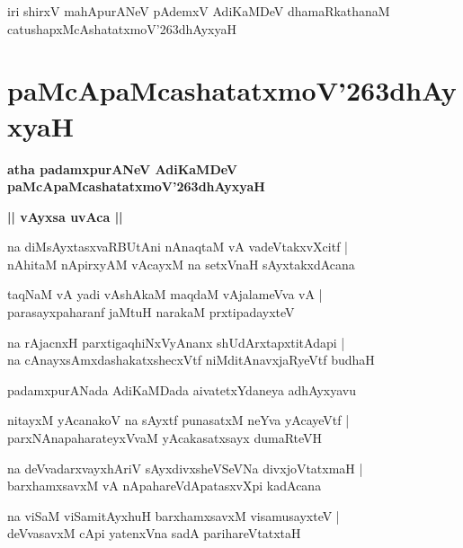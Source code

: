 \documentclass[twoside,12pt,openright]{book}
\def\S{\char'263}
\newcounter{shloka}[chapter]
\def\uvaca#1{\centerline{{\large\textbf{#1}}}}
\begin{document}
\begin{center}
iri shirxV mahApurANeV pAdemxV AdiKaMDeV dhamaRkathanaM catushapxMcAshatatxmoV\S dhAyxyaH 
\end{center}

\chapter{paMcApaMcashatatxmoV\S dhAyxyaH}

\begin{center}
{\LARGE\bfseries atha padamxpurANeV AdiKaMDeV paMcApaMcashatatxmoV\S dhAyxyaH}
\end{center}

\uvaca{|| vAyxsa uvAca ||}

\begin{shloka}
na diMsAyxtasxvaRBUtAni nAnaqtaM vA vadeVtakxvXcitf |\\
nAhitaM nApirxyAM vAcayxM na setxVnaH sAyxtakxdAcana
\end{shloka}

\begin{shloka}
taqNaM vA yadi vAshAkaM maqdaM vAjalameVva vA |\\
parasayxpaharanf jaMtuH narakaM prxtipadayxteV 
\end{shloka}

\begin{shloka}
na rAjacnxH parxtigaqhiNxVyAnanx shUdArxtapxtitAdapi |\\
na cAnayxsAmxdashakatxshecxVtf niMditAnavxjaRyeVtf budhaH 
\end{shloka}


\begin{center}
padamxpurANada AdiKaMDada aivatetxYdaneya adhAyxyavu
\end{center}

\begin{shloka}
nitayxM yAcanakoV na sAyxtf punasatxM neYva yAcayeVtf |\\
parxNAnapaharateyxVvaM yAcakasatxsayx dumaRteVH 
\end{shloka}

\begin{shloka}
na deVvadarxvayxhAriV sAyxdivxsheVSeVNa divxjoVtatxmaH |\\
barxhamxsavxM vA nApahareVdApatasxvXpi kadAcana
\end{shloka}

\begin{shloka}
na viSaM viSamitAyxhuH barxhamxsavxM visamusayxteV |\\
deVvasavxM cApi yatenxVna sadA parihareVtatxtaH 
\end{shloka}
\end{document}
